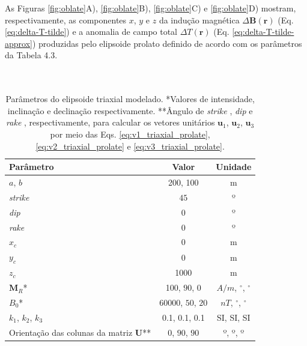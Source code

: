 As Figuras \ref{fig:oblate}A), \ref{fig:oblate}B), \ref{fig:oblate}C) e \ref{fig:oblate}D) mostram, respectivamente, as componentes $x$, $y$ e $z$ da indução magnética $\Delta \mathbf{B}(\mathbf{r})$ (Eq. \ref{eq:delta-T-tilde}) e a
anomalia de campo total $\Delta T (\mathbf{r})$ (Eq. \ref{eq:delta-T-tilde-approx}) produzidas pelo elipsoide prolato definido de acordo com os parâmetros da Tabela 4.3.
\\\\\\

\begin{table}[h!]
	\begin{center}
		\begin{tabular}{|l|c|c|}
			\hline
			\textbf{Parâmetro}  & \textbf{Valor}  & \textbf{Unidade} \\
			\hline 
			$a$, $b$   & 200, 100 & m\\
			\hline
			\textit{strike}   & $45$ & º\\
			\hline
			\textit{dip}    & $0$ & º\\
			\hline
			\textit{rake}   & $0$  & º\\
			\hline
			$x_c$   & 0  & m\\
			\hline          
			$y_c$   & 0  & m\\
			\hline                
			$z_c$   & 1000  & m\\
			\hline
			$\mathbf{M}_{R}$*  & 100, $90$, $0$ & $A/m$, $^{\circ}$, $^{\circ}$\\
			\hline
			$B_0$*    & 60000, $50$, $20$ & $nT$, $^{\circ}$, $^{\circ}$\\
			\hline
			$k_{1}$, $k_{2}$, $k_{3}$   & 0.1, 0.1, 0.1  & SI, SI, SI\\
			\hline
			Orientação das colunas da matriz $\mathbf{U}$**   & $0$, $90$, $90$  & º, º, º\\
			\hline
			
		\end{tabular}
		\caption{Parâmetros do elipsoide triaxial modelado. *Valores de intensidade, inclinação e declinação respectivamente. **Ângulo de \textit{strike} , \textit{dip}  e \textit{rake} , respectivamente, para calcular os vetores unitários $\mathbf{u}_{1}$, $\mathbf{u}_{2}$, $\mathbf{u}_{3}$ por meio das Eqs. \ref{eq:v1_triaxial_prolate}, \ref{eq:v2_triaxial_prolate} e \ref{eq:v3_triaxial_prolate}.}
	\end{center}
	\label{tab:prolato}
\end{table}

